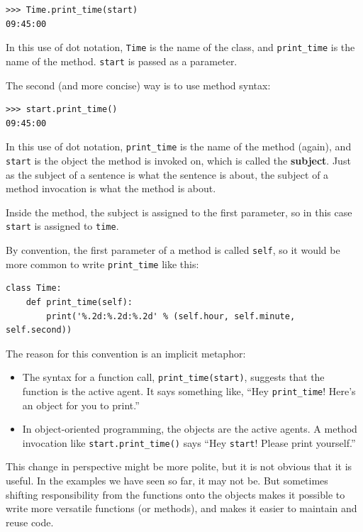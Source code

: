 \documentclass[10pt]{book}
\begin{document}
\begin{verbatim}
>>> Time.print_time(start)
09:45:00
\end{verbatim}
%
In this use of dot notation, {\tt Time} is the name of the class,
and \verb"print_time" is the name of the method.  {\tt start} is
passed as a parameter.

The second (and more concise) way is to use method syntax:

\begin{verbatim}
>>> start.print_time()
09:45:00
\end{verbatim}
%
In this use of dot notation, \verb"print_time" is the name of the
method (again), and {\tt start} is the object the method is
invoked on, which is called the {\bf subject}.  Just as the
subject of a sentence is what the sentence is about, the subject
of a method invocation is what the method is about.

Inside the method, the subject is assigned to the first
parameter, so in this case {\tt start} is assigned
to {\tt time}.

By convention, the first parameter of a method is
called {\tt self}, so it would be more common to write
\verb"print_time" like this:

\begin{verbatim}
class Time:
    def print_time(self):
        print('%.2d:%.2d:%.2d' % (self.hour, self.minute, self.second))
\end{verbatim}
%
The reason for this convention is an implicit metaphor:

\begin{itemize}

\item The syntax for a function call, \verb"print_time(start)",
  suggests that the function is the active agent.  It says something
  like, ``Hey \verb"print_time"!  Here's an object for you to print.''

\item In object-oriented programming, the objects are the active
  agents.  A method invocation like \verb"start.print_time()" says
  ``Hey {\tt start}!  Please print yourself.''

\end{itemize}

This change in perspective might be more polite, but it is not obvious
that it is useful.  In the examples we have seen so far, it may not
be.  But sometimes shifting responsibility from the functions onto the
objects makes it possible to write more versatile functions (or
methods), and makes it easier to maintain and reuse code.
\end{document}
